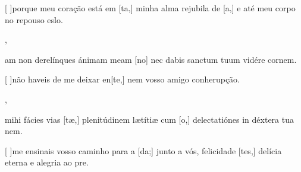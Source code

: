 {    {\item {}[ ]{por}que meu coração está em [ta,] minha alma rejubila de [a,] e até meu corpo no repouso eslo.~\Antiphona},
  {\item {}am non derelínques ánimam meam [\-no] nec dabis sanctum tuum vidére cor\-nem.~\Antiphona}%
    {\item {}[ ]{não} haveis de me deixar en[te,] nem vosso amigo conherupção.~\Antiphona},
  {\item {} mihi fácies vias [tæ,] plenitúdinem lætítiæ cum [o,] delectatiónes in déxtera tua nem.~\Antiphona}%
    {\item {}[ ]{me} ensinais vosso caminho para a [da;] junto a vós, felicidade [tes,] delícia eterna e alegria ao pre.~\Antiphona}
}